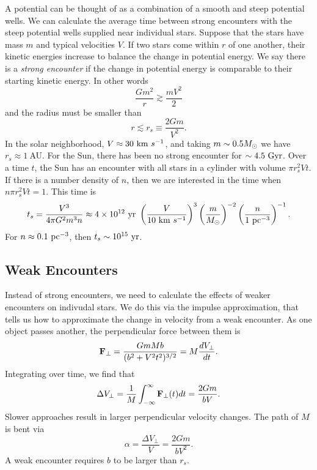 \documentclass[]{article}
\begin{document}
A potential can be thought of as a combination of a smooth and steep potential wells.
We can calculate the average time between strong encounters with the steep
potential wells supplied near individual stars. Suppose that the
stars have mass $m$ and typical velocities $V$. If two stars come
within $r$ of one another, their kinetic energies increase to balance the
change in potential energy.  We say there is a {\it strong encounter}
if the change in potential energy is comparable to their starting
kinetic energy.  In other words
\begin{equation}
\frac{Gm^{2}}{r} \gtrsim \frac{mV^{2}}{2}
\end{equation}
\noindent
and the radius must be smaller than
\begin{equation}
r \lesssim r_{s} \equiv \frac{2Gm}{V^2}.
\end{equation}
\noindent
In the solar neighborhood, $V\approx30~\mathrm{km}~s^{-1}$, and taking $m\sim0.5M_{\odot}$ we have $r_s \approx 1~$AU.
For the Sun, there has been no strong encounter for $\sim4.5~\mathrm{Gyr}$. Over a time $t$, the Sun
has an encounter with all stars in a cylinder with volume $\pi r_s^2 V t$. If there is a number
density of $n$, then we are interested in the time when $n\pi r_s^2 V t = 1$.  This time is
\begin{equation}
t_s = \frac{V^3}{4\pi G^2 m^3 n} \approx 4 \times 10^{12}~\mathrm{yr}~\left(\frac{V}{10~\mathrm{km}~s^{-1}}\right)^3\left(\frac{m}{M_{\odot}}\right)^{-2}\left(\frac{n}{1~\mathrm{pc}^{-3}}\right)^{-1}.
\end{equation}
\noindent
For $n\approx0.1~\mathrm{pc}^{-3}$, then $t_s\sim10^{15}~\mathrm{yr}$.


\subsection{Weak Encounters}

Instead of strong encounters, we need to calculate the effects of weaker encounters
on indivudal stars.  We do this via the impulse approximation, that tells us how to
approximate the change in velocity from a weak encounter.  As one object passes
another, the perpendicular force between them is
\begin{equation}
\mathbf{F}_{\perp} = \frac{GmMb}{(b^2 + V^2t^2)^{3/2}} = M \frac{dV_{\perp}}{dt}.
\end{equation}
\noindent
Integrating over time, we find that
\begin{equation}
\Delta V_{\perp} = \frac{1}{M} \int_{-\infty}^{\infty} \mathbf{F}_{\perp}(t) dt =\frac{2 G m}{bV}.
\end{equation}
Slower approaches result in larger perpendicular velocity changes. The
path of $M$ is bent via
\begin{equation}
\alpha = \frac{\Delta V_{\perp}}{V} = \frac{2Gm}{bV^2}.
\end{equation}
\noindent
A weak encounter requires $b$ to be larger than $r_s$.
\end{document}
